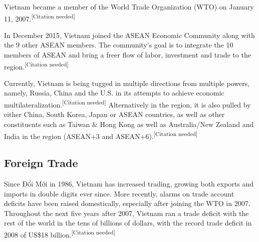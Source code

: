 \documentclass{article}
\begin{document}
Vietnam became a member of the World Trade Organization (WTO) on January 11, 2007.\textsuperscript{[Citation needed]}

In December 2015, Vietnam joined the ASEAN Economic Community along with the 9 other ASEAN members. The community's goal is to integrate the 10 members of ASEAN and bring a freer flow of labor, investment and trade to the region.\textsuperscript{[Citation needed]}

Currently, Vietnam is being tugged in multiple directions from multiple powers, namely, Russia, China and the U.S. in its attempts to achieve economic multilateralization.\textsuperscript{[Citation needed]} Alternatively in the region, it is also pulled by either China, South Korea, Japan or ASEAN countries, as well as other constituents such as Taiwan \& Hong Kong as well as Australia/New Zealand and India in the region (ASEAN+3 and ASEAN+6).\textsuperscript{[Citation needed]}

\subsection*{Foreign Trade}
Since Đổi Mới in 1986, Vietnam has increased trading, growing both exports and imports in double digits ever since. More recently, alarms on trade account deficits have been raised domestically, especially after joining the WTO in 2007. Throughout the next five years after 2007, Vietnam ran a trade deficit with the rest of the world in the tens of billions of dollars, with the record trade deficit in 2008 of US\$18 billion.\textsuperscript{[Citation needed]}
\end{document}
